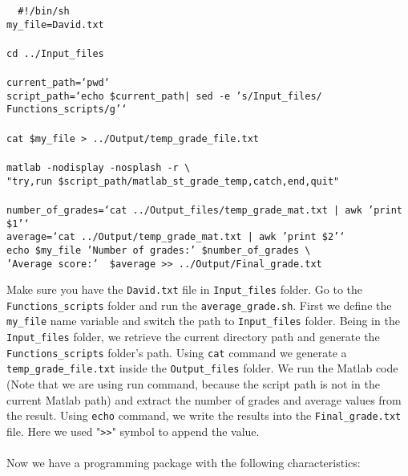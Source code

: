  \begin{mdframed}[hidealllines=true,backgroundcolor=gray!20]
 \begin{singlespace}
 \fontsize{10pt}{1pt}
\texttt{
\noindent
{ \color{matlab_green} \#!/bin/sh} \\
my\_file=David.txt\\
\\
cd ../Input\_files\\ 
\\
current\_path={\color{red}`pwd`}\\
script\_path={\color{red}`echo \$current\_path| sed -e 's/Input\_files/ Functions\_scripts/g'`}\\
\\
cat \$my\_file > ../Output/temp\_grade\_file.txt\\
\\
matlab -nodisplay -nosplash -r   \textbackslash \\
{\color{red}"try,run \$script\_path/matlab\_st\_grade\_temp,catch,end,quit"}\\
\\
number\_of\_grades={\color{red}`cat ../Output\_files/temp\_grade\_mat.txt | awk '{print \$1}'`}\\
average={\color{red}`cat ../Output/temp\_grade\_mat.txt | awk '{print \$2}'`}\\
echo \$my\_file {\color{red}'Number of grades:'}  \$number\_of\_grades \textbackslash \\
\phantom{x}\hspace{14ex} {\color{red}'Average score:'} \  \$average >> ../Output/Final\_grade.txt
 }
 \end{singlespace}
\end{mdframed}
\noindent
Make sure you have the \texttt{David.txt} file in \texttt{Input\_files} folder. Go to the \texttt{Functions\_scripts} folder and run the \texttt{average\_grade.sh}.  First we define the \texttt{my\_file} name variable and switch the path to \texttt{Input\_files} folder. Being in the \texttt{Input\_files} folder, we retrieve the current directory path and generate the \texttt{Functions\_scripts} folder's path. Using \texttt{cat} command we generate a \texttt{temp\_grade\_file.txt} inside the \texttt{Output\_files} folder. We run the Matlab code (Note that we are using run command, because the script path is not in the current Matlab path) and extract the number of grades and average values from the result. Using \texttt{echo} command, we write the results into the \texttt{Final\_grade.txt} file. Here we used "\texttt{>>}" symbol to append the value. \\
\\
Now we have a programming package with the following characteristics:

